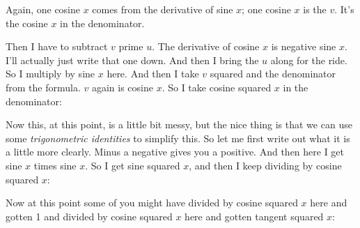 \documentclass[pdftex, brazil, 12pt, twoside]{article}
\begin{document}
Again, one cosine $x$ comes from the derivative of sine $x$;
one cosine $x$ is the $v$. It's the cosine $x$ in the denominator.

Then I have to subtract $v$ prime $u$.
The derivative of cosine $x$ is negative sine $x$.
I'll actually just write that one down.
And then I bring the $u$ along for the ride.
So I multiply by sine $x$ here.
And then I take $v$ squared and the denominator
from the formula. $v$ again is cosine $x$.
So I take cosine squared $x$ in the denominator:

\begin{figure}[H]
  \begin{center}
  \end{center}
\end{figure}

Now this, at this point, is a little bit messy,
but the nice thing is that we can
use some \emph{trigonometric identities} to simplify this.
So let me first write out what it is a little more clearly.
Minus a negative gives you a positive.
And then here I get sine $x$ times sine $x$.
So I get sine squared $x$, and then I
keep dividing by cosine squared $x$:

\begin{figure}[H]
  \begin{center}
  \end{center}
\end{figure}

Now at this point some of you might
have divided by cosine squared $x$ here
and gotten 1 and divided by cosine squared $x$ here
and gotten tangent squared $x$:
\end{document}
